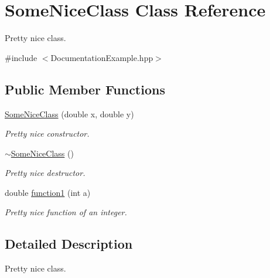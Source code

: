 \hypertarget{class_some_nice_class}{\section{Some\-Nice\-Class Class Reference}
\label{class_some_nice_class}
}


Pretty nice class.  




{\ttfamily \#include $<$Documentation\-Example.\-hpp$>$}

\subsection*{Public Member Functions}
\begin{DoxyCompactItemize}
\item 
\hyperlink{class_some_nice_class_ae27c9a65d844a82afbc8f550ff2a01a6}{Some\-Nice\-Class} (double x, double y)
\begin{DoxyCompactList}\small\item\em Pretty nice constructor. \end{DoxyCompactList}\item 
\hyperlink{class_some_nice_class_ae85029c495bfea52664da84c9ca12a65}{$\sim$\-Some\-Nice\-Class} ()
\begin{DoxyCompactList}\small\item\em Pretty nice destructor. \end{DoxyCompactList}\item 
double \hyperlink{class_some_nice_class_a6d0c0c467c0db70ff288459bada6b80d}{function1} (int a)
\begin{DoxyCompactList}\small\item\em Pretty nice function of an integer. \end{DoxyCompactList}\end{DoxyCompactItemize}


\subsection{Detailed Description}
Pretty nice class. 

